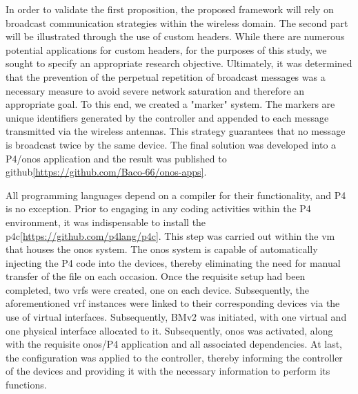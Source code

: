 In order to validate the first proposition, the proposed framework will rely on broadcast communication strategies within the wireless domain. The second part will be illustrated through the use of custom headers. While there are numerous potential applications for custom headers, for the purposes of this study, we sought to specify an appropriate research objective. Ultimately, it was determined that the prevention of the perpetual repetition of broadcast messages was a necessary measure to avoid severe network saturation and therefore an appropriate goal. 
To this end, we created a "marker" system. The markers are unique identifiers generated by the controller and appended to each message transmitted via the wireless antennas. This strategy guarantees that no message is broadcast twice by the same device. The final solution was developed into a P4/\gls{onos} application and the result was published to github\ref{https://github.com/Baco-66/onos-apps}.


All programming languages depend on a compiler for their functionality, and P4 is no exception. Prior to engaging in any coding activities within the P4 environment, it was indispensable to install the p4c\ref{https://github.com/p4lang/p4c}. This step was carried out within the \gls{vm} that houses the \gls{onos} system. The \gls{onos} system is capable of automatically injecting the P4 code into the devices, thereby eliminating the need for manual transfer of the file on each occasion.
Once the requisite setup had been completed, two \glspl{vrf} were created, one on each device. Subsequently, the aforementioned \gls{vrf} instances were linked to their corresponding devices via the use of virtual interfaces. Subsequently, BMv2 was initiated, with one virtual and one physical interface allocated to it. Subsequently, \gls{onos} was activated, along with the requisite \gls{onos}/P4 application and all associated dependencies. At last, the configuration was applied to the controller, thereby informing the controller of the devices and providing it with the necessary information to perform its functions.

